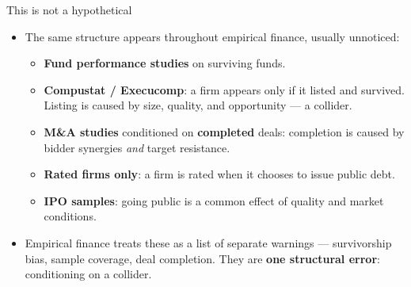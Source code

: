 \documentclass[
  11pt,
  ignorenonframetext,
  aspectratio=169,
]{beamer}
\providecommand{\tightlist}{%
  \setlength{\itemsep}{0pt}\setlength{\parskip}{0pt}}
\begin{document}
\begin{frame}{This is not a hypothetical}
\protect{}\label{this-is-not-a-hypothetical}
\begin{itemize}
\tightlist
\item
  The same structure appears throughout empirical finance, usually
  unnoticed:

  \begin{itemize}
  \tightlist
  \item
    \textbf{Fund performance studies} on surviving funds.
  \item
    \textbf{Compustat / Execucomp}: a firm appears only if it listed and
    survived. Listing is caused by size, quality, and opportunity --- a
    collider.
  \item
    \textbf{M\&A studies} conditioned on \textbf{completed} deals:
    completion is caused by bidder synergies \emph{and} target
    resistance.
  \item
    \textbf{Rated firms only}: a firm is rated when it chooses to issue
    public debt.
  \item
    \textbf{IPO samples}: going public is a common effect of quality and
    market conditions.
  \end{itemize}
\item
  Empirical finance treats these as a list of separate warnings ---
  survivorship bias, sample coverage, deal completion. They are
  \textbf{one structural error}: conditioning on a collider.
\end{itemize}
\end{frame}
\end{document}
